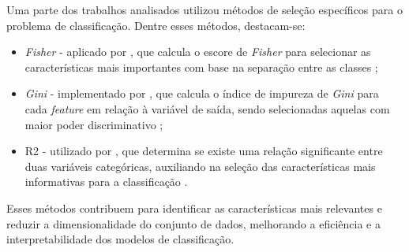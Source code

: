Uma parte dos trabalhos analisados utilizou métodos de seleção específicos para o problema de classificação. Dentre esses métodos, destacam-se:
\begin{itemize}
    \item \textit{Fisher} - aplicado por , que calcula o escore de \textit{Fisher} para selecionar as características mais importantes com base na separação entre as classes \cite{fisher1936use};

    \item  \textit{Gini} - implementado por , que calcula o índice de impureza de \textit{Gini} para cada \textit{feature} em relação à variável de saída, sendo selecionadas aquelas com maior poder discriminativo \cite{gini1921measurement}; 

    \item \ac{R2} - utilizado por , que determina se existe uma relação significante entre duas variáveis categóricas, auxiliando na seleção das características mais informativas para a classificação \cite{pearson1900x}.
\end{itemize}
 Esses métodos contribuem para identificar as características mais relevantes e reduzir a dimensionalidade do conjunto de dados, melhorando a eficiência e a interpretabilidade dos modelos de classificação.

